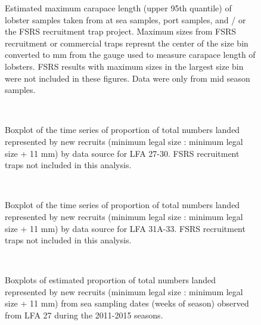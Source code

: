 \documentclass[11pt]{article}
\newcommand{\e}{/backup/bio_data/bio.lobster/figures/} %
\begin{document}
\begin{landscape}
\begin{figure}
                    \caption{Estimated maximum carapace length (upper 95th quantile) of lobster samples taken from at sea samples, port samples, and / or the FSRS recruitment trap project. Maximum sizes from FSRS recruitment or commercial traps represnt the center of the size bin converted to mm from the gauge used to measure carapace length of lobsters. FSRS results with maximum sizes in the largest size bin were not included in these figures.  Data were only from mid season samples.}
        \end{figure}

\end{landscape}


\begin{figure}
        \centering
         \\
                     \caption{Boxplot of the time series of proportion of total numbers landed represented by new recruits (minimum legal size : minimum legal size + 11 mm) by data source for LFA 27-30. FSRS recruitment traps not included in this analysis.}
        \end{figure}

\begin{figure}
        \centering
         \\
                    \caption{Boxplot of the time series of proportion of total numbers landed represented by new recruits (minimum legal size : minimum legal size + 11 mm) by data source for LFA 31A-33. FSRS recruitment traps not included in this analysis.}
        \end{figure}

\begin{figure}
        \centering
         \\
                     \caption{Boxplots of estimated proportion of total numbers landed represented by new recruits (minimum legal size : minimum legal size + 11 mm) from sea sampling dates (weeks of season) observed from LFA 27 during the 2011-2015 seasons. }
        \end{figure}
\end{document}
